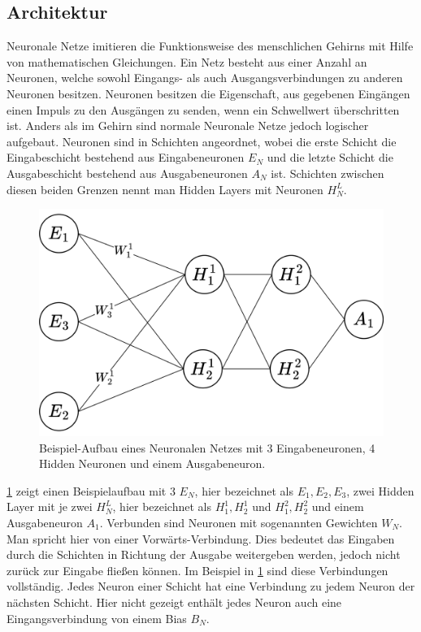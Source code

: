 \subsection{Architektur}
Neuronale Netze imitieren die Funktionsweise des menschlichen Gehirns mit Hilfe von mathematischen Gleichungen.
Ein Netz besteht aus einer Anzahl an Neuronen, welche sowohl Eingangs- als auch Ausgangsverbindungen zu anderen Neuronen besitzen.
Neuronen besitzen die Eigenschaft, aus gegebenen Eingängen einen Impuls zu den Ausgängen zu senden, wenn ein Schwellwert überschritten ist.
Anders als im Gehirn sind normale Neuronale Netze jedoch logischer aufgebaut.
Neuronen sind in Schichten angeordnet, wobei die erste Schicht die Eingabeschicht bestehend aus Eingabeneuronen $E_N$ und die letzte Schicht die Ausgabeschicht bestehend aus Ausgabeneuronen $A_N$ ist.
Schichten zwischen diesen beiden Grenzen nennt man Hidden Layers mit Neuronen $H^L_N$.\\

\begin{figure}
    \centering
    \includegraphics[width=\textwidth]{zeichnungen/nn.png}
    \caption{Beispiel-Aufbau eines Neuronalen Netzes mit 3 Eingabeneuronen, 4 Hidden Neuronen und einem Ausgabeneuron.}\label{nn_simple}
\end{figure}

\cref{nn_simple} zeigt einen Beispielaufbau mit 3 $E_N$, hier bezeichnet als $E_1,E_2,E_3$, zwei Hidden Layer mit je zwei $H^L_N$, hier bezeichnet als $H^1_1, H^1_2$ und $H^2_1, H^2_2$ und einem Ausgabeneuron $A_1$.
Verbunden sind Neuronen mit sogenannten Gewichten $W_N$. Man spricht hier von einer Vorwärts-Verbindung.
Dies bedeutet das Eingaben durch die Schichten in Richtung der Ausgabe weitergeben werden, jedoch nicht zurück zur Eingabe fließen können.
Im Beispiel in \cref{nn_simple} sind diese Verbindungen vollständig.
Jedes Neuron einer Schicht hat eine Verbindung zu jedem Neuron der nächsten Schicht.
Hier nicht gezeigt enthält jedes Neuron auch eine Eingangsverbindung von einem Bias $B_N$.

